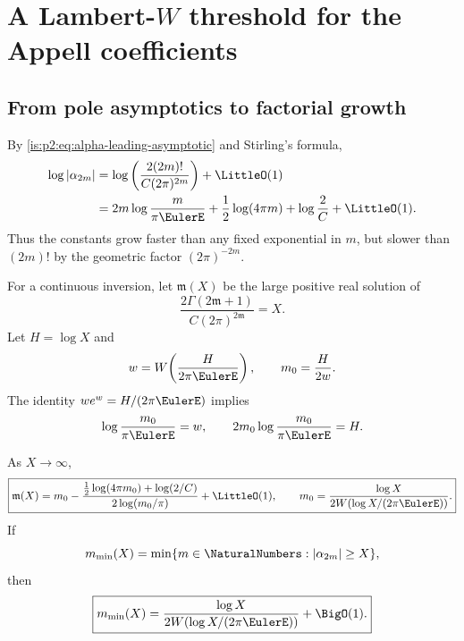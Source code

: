 \section{A Lambert-\texorpdfstring{$W$}{W} threshold for the Appell coefficients}
\label{is:p2:sec:lambert}

\subsection{From pole asymptotics to factorial growth}

By \eqref{is:p2:eq:alpha-leading-asymptotic} and Stirling's formula,
\begin{align}
 \log|\alpha_{2m}|
 &=\log\left(\frac{2(2m)!}{C(2\pi)^{2m}}\right)+\LittleO(1)
 \notag\\
 &=2m\log\frac{m}{\pi\EulerE}
 +\frac12\log(4\pi m)+\log\frac2C+\LittleO(1).
 \label{is:p2:eq:log-alpha-Stirling}
\end{align}
Thus the constants grow faster than any fixed exponential in $m$, but slower than $(2m)!$ by the
geometric factor $(2\pi)^{-2m}$.

For a continuous inversion, let $\mathfrak m(X)$ be the large positive real solution of
\begin{equation}
 \frac{2\Gamma(2\mathfrak m+1)}{C(2\pi)^{2\mathfrak m}}=X.
 \label{is:p2:eq:continuous-threshold}
\end{equation}
Let $H=\log X$ and
\begin{equation}
 w=W\!\left(\frac{H}{2\pi\EulerE}\right),
 \qquad
 m_0=\frac{H}{2w}.
 \label{is:p2:eq:m0-W}
\end{equation}
The identity $we^w=H/(2\pi\EulerE)$ implies
\begin{equation}
 \log\frac{m_0}{\pi\EulerE}=w,
 \qquad
 2m_0\log\frac{m_0}{\pi\EulerE}=H.
 \label{is:p2:eq:m0-main-equation}
\end{equation}

\begin{theorem}
\label{is:p2:thm:Lambert-threshold}
As $X\to\infty$,
\begin{equation}
 \boxed{
 \mathfrak m(X)
 =m_0-
 \frac{\frac12\log(4\pi m_0)+\log(2/C)}
 {2\log(m_0/\pi)}
 +\LittleO(1),
 \qquad
 m_0=\frac{\log X}{2W(\log X/(2\pi\EulerE))}.
 }
 \label{is:p2:eq:continuous-threshold-expansion}
\end{equation}
If
\begin{equation}
 m_{\min}(X)=\min\{m\in\NaturalNumbers:|\alpha_{2m}|\ge X\},
 \label{is:p2:eq:integer-threshold}
\end{equation}
then
\begin{equation}
 \boxed{
 m_{\min}(X)
 =\frac{\log X}{2W(\log X/(2\pi\EulerE))}+\BigO(1).
 }
 \label{is:p2:eq:integer-threshold-W}
\end{equation}
\end{theorem}

